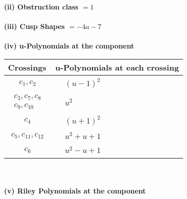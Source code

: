 \documentclass[1p]{elsarticle_modified}
\theoremstyle{definition}
\begin{document}
\flushleft \textbf{(ii) Obstruction class $= 1$}\\~\\
\flushleft \textbf{(iii) Cusp Shapes $= -4 a-7$}\\~\\
\newpage\renewcommand{\arraystretch}{1}
\flushleft \textbf{(iv) u-Polynomials at the component}\newline \\
\begin{tabular}{m{50pt}|m{274pt}}
Crossings & \hspace{64pt}u-Polynomials at each crossing \\
\hline $$\begin{aligned}c_{1},c_{2}\end{aligned}$$&$\begin{aligned}
&(u-1)^2
\end{aligned}$\\
\hline $$\begin{aligned}c_{3},c_{7},c_{8}\\c_{9},c_{10}\end{aligned}$$&$\begin{aligned}
&u^2
\end{aligned}$\\
\hline $$\begin{aligned}c_{4}\end{aligned}$$&$\begin{aligned}
&(u+1)^2
\end{aligned}$\\
\hline $$\begin{aligned}c_{5},c_{11},c_{12}\end{aligned}$$&$\begin{aligned}
&u^2+u+1
\end{aligned}$\\
\hline $$\begin{aligned}c_{6}\end{aligned}$$&$\begin{aligned}
&u^2- u+1
\end{aligned}$\\
\hline
\end{tabular}\\~\\
\newpage\renewcommand{\arraystretch}{1}
\flushleft \textbf{(v) Riley Polynomials at the component}\newline \\
\end{document}
